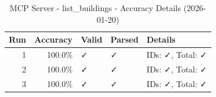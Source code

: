 \begin{table}[ht]
\centering
\small
\caption{MCP Server - list\_buildings - Accuracy Details (2026-01-20)}
\label{tab:mcp\_list\_buildings\_accuracy\_2026-01-20}
\begin{tabular}{r r l l p{6cm}}
\hline
Run & Accuracy & Valid & Parsed & Details \\
\hline
1 & 100.0\% & ✓ & ✓ & IDs: ✓, Total: ✓ \\
2 & 100.0\% & ✓ & ✓ & IDs: ✓, Total: ✓ \\
3 & 100.0\% & ✓ & ✓ & IDs: ✓, Total: ✓ \\
\hline
\end{tabular}
\end{table}
